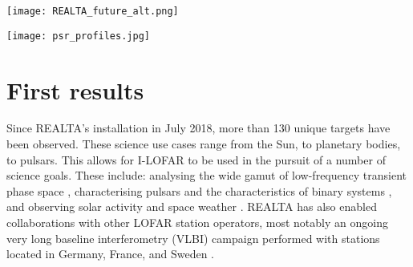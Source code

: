 \begin{figure*}[t]
    \centering
    \texttt{[image: REALTA\_future\_alt.png]}
    \caption[System diagram for REALTA.]{System diagram for REALTA, including future data preparation, processing, and archiving capabilities. Solid lines indicate existing features, while dashed lines denote stages under development. REALTA is currently capable of capturing data from the I-LOFAR radio telescope and archiving it in near real-time. The I-LOFAR team are in the process of developing a variety of data processing pipelines that will flag RFI, identify and characterise SRBs, pulsars, RRATs, FRBs, and SETI signals. Machine learning methods are being explored for a number of these tasks.}
    \label{fig:REALTA_future}
\end{figure*}

\begin{figure*}[t]
    \centering
    \texttt{[image: psr\_profiles.jpg]}
    \caption[Sample of 19 pulsars observed with I-LOFAR and REALTA.]{Sample of 19 pulsars observed with I-LOFAR and REALTA. Each of these observations is 6 minutes in duration and were taken on 4--5 March 2020 using the HBA antennas (\SIrange{110}{190}{\mega \hertz}). The data were processed using the method described in section \ref{sec:pulsarproc} and plotted using \texttt{PSRCHIVE}. The x-axis in each plot is the pulse phase in radians, while the y-axis is flux density in arbitrary units.}
    \label{fig:pulsar-pc1}
\end{figure*}

\section{First results}
\label{sec:results}
Since REALTA's installation in July 2018, more than 130 unique targets have been observed. These science use cases range from the Sun, to planetary bodies, to pulsars. This allows for I-LOFAR to be used in the pursuit of a number of science goals. These include: analysing the wide gamut of low-frequency transient phase space \citep{KeanePhaseSpace2018}, characterising pulsars and the characteristics of binary systems \citep{Manchester2017}, and observing solar activity and space weather \citep{Maguire2020}. 
REALTA has also enabled collaborations with other LOFAR station operators, most notably an ongoing very long baseline interferometry (VLBI) campaign performed with stations located in Germany, France, and Sweden \citep[in a continuation of ][]{Wucknitz2019}.

